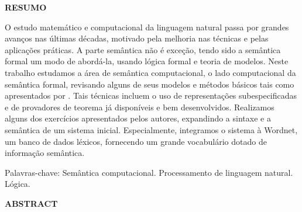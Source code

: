 \documentclass[12pt, a4paper, twoside]{article}
\theoremstyle{definition}
\begin{document}
\clearpage
\newpage
\thispagestyle{empty}
\begin{center}
	\textbf{RESUMO}
\end{center}

	O estudo matemático e computacional da linguagem natural passa por grandes avanços nas últimas décadas, motivado pela melhoria nas técnicas e pelas aplicações práticas. A parte semântica não é exceção, tendo sido a semântica formal um modo de abordá-la, usando lógica formal e teoria de modelos. Neste trabalho estudamos a área de semântica computacional, o lado computacional da semântica formal, revisando alguns de seus modelos e métodos básicos tais como apresentados por \cite{BlackburnBos:2005}. Tais técnicas incluem o uso de representações subespecificadas e de provadores de teorema já disponíveis e bem desenvolvidos. Realizamos alguns dos exercícios apresentados pelos autores, expandindo a sintaxe e a semântica de um sistema inicial. Especialmente, integramos o sistema à Wordnet, um banco de dados léxicos, fornecendo um grande vocabulário dotado de informação semântica.
	
	Palavras-chave: Semântica computacional. Processamento de linguagem natural. Lógica.

\clearpage
\newpage
\thispagestyle{empty}
\begin{center}
	\textbf{ABSTRACT}
\end{center}
	
	

\clearpage



\newpage
\thispagestyle{empty}
\end{document}
